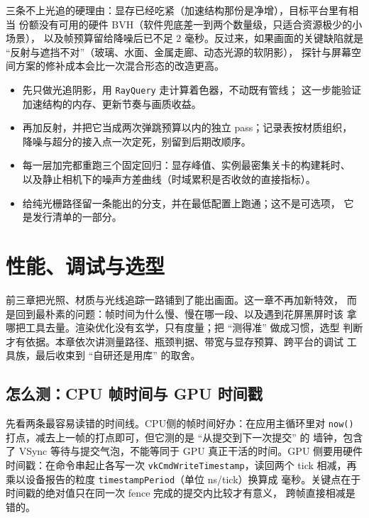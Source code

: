 \documentclass[12pt,a4paper,fontset=fandol]{ctexbook}
\newcommand{\Fn}[1]{\texttt{#1()}}
\newcommand{\Tp}[1]{\texttt{#1}}
\newcommand{\Lang}[1]{\textsf{#1}}
\newcommand{\DomCPU}{\Lang{CPU}}
\newcommand{\DomGPU}{\Lang{GPU}}
\begin{document}
三条不上光追的硬理由：显存已经吃紧（加速结构那份是净增），目标平台里有相当
份额没有可用的硬件 BVH（软件兜底差一到两个数量级，只适合资源极少的小场景），
以及帧预算留给降噪后已不足 2 毫秒。反过来，如果画面的关键缺陷就是
``反射与遮挡不对''（玻璃、水面、金属走廊、动态光源的软阴影），
探针与屏幕空间方案的修补成本会比一次混合形态的改造更高。

\begin{bestpractice}[title={接入光追的顺序}]
\begin{itemize}
\item 先只做光追阴影，用 \Tp{RayQuery} 走计算着色器，不动既有管线；
这一步能验证加速结构的内存、更新节奏与画质收益。
\item 再加反射，并把它当成两次弹跳预算以内的独立 pass；记录表按材质组织，
降噪与超分的接入点一次定死，别留到后期改顺序。
\item 每一层加完都重跑三个固定回归：显存峰值、实例最密集关卡的构建耗时、
以及静止相机下的噪声方差曲线（时域累积是否收敛的直接指标）。
\item 给纯光栅路径留一条能出的分支，并在最低配置上跑通；这不是可选项，
它是发行清单的一部分。
\end{itemize}
\end{bestpractice}

\chapter{性能、调试与选型}
\label{ch:ch14-perf-tools}

前三章把光照、材质与光线追踪一路铺到了能出画面。这一章不再加新特效，
而是回到最朴素的问题：帧时间为什么慢、慢在哪一段、以及遇到花屏黑屏时该
拿哪把工具去量。渲染优化没有玄学，只有度量；把 ``测得准'' 做成习惯，选型
判断才有依据。本章依次讲测量路径、瓶颈判据、带宽与显存预算、跨平台的调试
工具族，最后收束到 ``自研还是用库'' 的取舍。

\section{怎么测：CPU 帧时间与 GPU 时间戳}

先看两条最容易读错的时间线。\DomCPU 侧的帧时间好办：在应用主循环里对
\Fn{now} 打点，减去上一帧的打点即可，但它测的是 ``从提交到下一次提交'' 的
墙钟，包含了 VSync 等待与提交气泡，不能等同于 GPU 真正干活的时间。\DomGPU
侧要用硬件时间戳：在命令串起止各写一次 \Tp{vkCmdWriteTimestamp}，读回两个
tick 相减，再乘以设备报告的粒度 \Tp{timestampPeriod}（单位 ns/tick）换算成
毫秒。关键点在于时间戳的绝对值只在同一次 fence 完成的提交内比较才有意义，
跨帧直接相减是错的。
\end{document}
